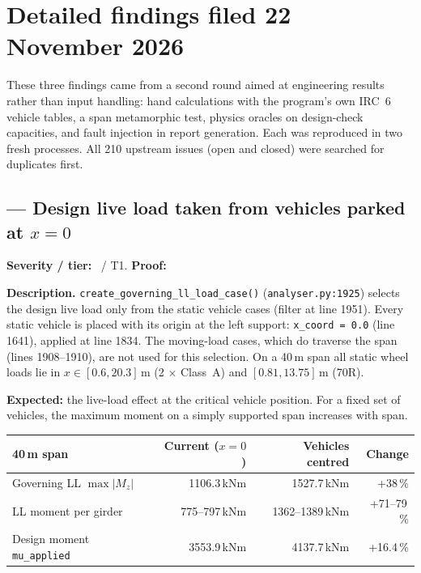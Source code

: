 \section{Detailed findings filed 22 November 2026}

These three findings came from a second round aimed at engineering results rather than input handling: hand calculations with the program's own IRC~6 vehicle tables, a span metamorphic test, physics oracles on design-check capacities, and fault injection in report generation. Each was reproduced in two fresh processes. All 210 upstream issues (open and closed) were searched for duplicates first.

\subsection{ --- Design live load taken from vehicles parked at $x = 0$}
\textbf{Severity / tier:} \sevH\ / T1. \quad \textbf{Proof:} 

\textbf{Description.} \texttt{create\_governing\_ll\_load\_case()} (\texttt{analyser.py:1925}) selects the design live load only from the static vehicle cases (filter at line 1951). Every static vehicle is placed with its origin at the left support: \texttt{x\_coord = 0.0} (line 1641), applied at line 1834. The moving-load cases, which do traverse the span (lines 1908--1910), are not used for this selection. On a 40\,m span all static wheel loads lie in $x \in [0.6, 20.3]$\,m (2 $\times$ Class~A) and $[0.81, 13.75]$\,m (70R).

\textbf{Expected:} the live-load effect at the critical vehicle position. For a fixed set of vehicles, the maximum moment on a simply supported span increases with span.

\begin{center}\begin{tabular}{@{}lrrr@{}}
\toprule
40\,m span & Current ($x = 0$) & Vehicles centred & Change \\
\midrule
Governing LL $\max|M_z|$ & 1106.3\,kNm & 1527.7\,kNm & +38\,\% \\
LL moment per girder & 775--797\,kNm & 1362--1389\,kNm & +71--79\,\% \\
Design moment \texttt{mu\_applied} & 3553.9\,kNm & 4137.7\,kNm & +16.4\,\% \\
\bottomrule
\end{tabular}\end{center}

